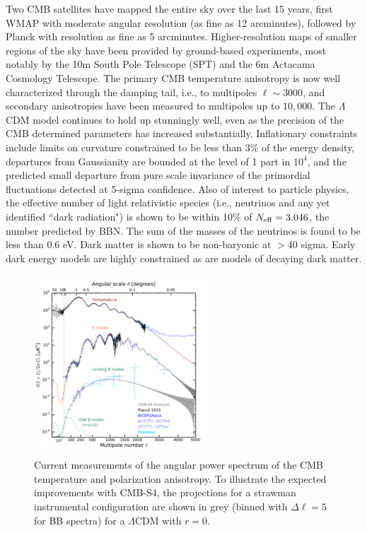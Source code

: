 Two CMB satellites have mapped the entire sky over the last 15 years, first WMAP with moderate angular resolution (as fine as 12 arcminutes), followed by Planck with resolution as fine as 5 arcminutes. Higher-resolution maps of smaller regions of the sky have been provided by ground-based experiments, most notably by the 10m South Pole Telescope (SPT) and the 6m Actacama Cosmology Telescope. The primary CMB temperature anisotropy is now well characterized through the damping tail, i.e., to multipoles $\ell \sim 3000$, and secondary anisotropies have been measured to multipoles up to  $10,000$.   The $\Lambda$CDM model continues to hold up stunningly well, even as the precision of the CMB determined parameters has increased substantially. Inflationary constraints include limits on curvature constrained to be less than 3\% of the energy density,
departures from Gaussianity are bounded at the level of 1 part in $10^4$,
and 
the predicted small departure from pure scale invariance of the primordial fluctuations detected at 5-sigma confidence. Also of interest to particle physics, the effective number of light relativistic species (i.e., neutrinos and any yet identified ``dark radiation") is shown to be within 10\% of $N_\mathrm{eff} = 3.046$, the number predicted by BBN.  The sum of the masses of the neutrinos is found to be less than 0.6 eV. Dark matter is shown to be non-baryonic at $> 40$ sigma. Early dark energy models are highly constrained as are models of decaying dark matter. 

\begin{figure}[t]
\centering \includegraphics[width=0.6\textwidth]{Intro/CurrentCMB_withcmbs4.pdf}
\caption{Current measurements of the angular power spectrum of the CMB temperature and polarization anisotropy. To illustrate the expected improvements with CMB-S4, the projections for a strawman instrumental configuration are shown in grey (binned with $\Delta\ell = 5$ for BB spectra) for a $\Lambda$CDM with $r =0$.}
\label{fig:CurrentCMB}
\end{figure}

